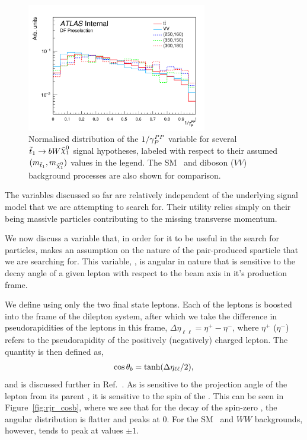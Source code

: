 \begin{figure}[!htb]
    \begin{center}
        \includegraphics[width=0.7\textwidth]{figures/search_stop2l/strategy/comp_plots/dfpresel_gamInvRP1}
        \caption{
            Normalised distribution of the $1/\gamma_P^{PP}$ variable for several $\stopone \rightarrow b W \ninoone$
            signal hypotheses, labeled with respect to their assumed $(m_{\stopone}, m_{\ninoone})$ values in the
            legend.
            The SM \ttbar~and diboson ($VV$) background processes are also shown for comparison.
        }
        \label{fig:rjr_gaminv}
    \end{center}
\end{figure}

The variables discussed so far are relatively independent of the underlying signal model
that we are attempting to search for.
Their utility relies simply on their being massivle particles contributing to the missing
transverse momentum.

We now discuss a variable that, in order for it to be useful in the search for \stopone particles,
makes an assumption on the nature of the pair-produced sparticle that we are
searching for.
This variable, \cosb, is angular in nature that is sensitive to the decay angle of a given lepton with
respect to the beam axis in it's production frame.

We define \cosb using only the two final state leptons.
Each of the leptons is boosted into the frame of the dilepton system, after which
we take the difference in pseudorapidities of the leptons in this frame,
$\Delta \eta_{\ell \ell} = \eta^+ - \eta^-$, where $\eta^+$ ($\eta^-$) refers to the
pseudorapidity of the positively (negatively) charged lepton.
The quantity \cosb is then defined as,
\begin{align}
    \cos\theta_b = \tanh ( \Delta \eta_{\ell\ell} / 2),
    \label{eq:rjr_cosb}
\end{align}
and is discussed further in Ref.~\cite{Melia:2011cu}.
As \cosb is sensitive to the projection angle of the lepton from its parent \stopone, it is
sensitive to the spin of the \stopone.
This can be seen in Figure~\ref{fig:rjr_cosb}, where we see that for the decay of the
spin-zero \stopone, the angular distribution is flatter and peaks at 0.
For the SM \ttbar~and $WW$ backgrounds, however, \cosb tends to peak at values $\pm 1$.

